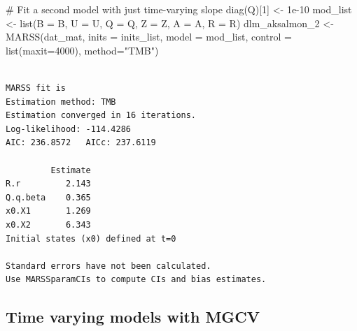 \documentclass[
  letterpaper,
  DIV=11,
  numbers=noendperiod]{scrartcl}
\newenvironment{Shaded}{\begin{snugshade}}{\end{snugshade}}
\newcommand{\AttributeTok}[1]{\textcolor[rgb]{0.40,0.45,0.13}{#1}}
\newcommand{\CommentTok}[1]{\textcolor[rgb]{0.37,0.37,0.37}{#1}}
\newcommand{\DecValTok}[1]{\textcolor[rgb]{0.68,0.00,0.00}{#1}}
\newcommand{\FloatTok}[1]{\textcolor[rgb]{0.68,0.00,0.00}{#1}}
\newcommand{\FunctionTok}[1]{\textcolor[rgb]{0.28,0.35,0.67}{#1}}
\newcommand{\NormalTok}[1]{\textcolor[rgb]{0.00,0.23,0.31}{#1}}
\newcommand{\OtherTok}[1]{\textcolor[rgb]{0.00,0.23,0.31}{#1}}
\newcommand{\StringTok}[1]{\textcolor[rgb]{0.13,0.47,0.30}{#1}}
\begin{document}
\begin{Shaded}
\begin{Highlighting}[]
\CommentTok{\# Fit a second model with just time{-}varying slope}
\FunctionTok{diag}\NormalTok{(Q)[}\DecValTok{1}\NormalTok{] }\OtherTok{\textless{}{-}} \FloatTok{1e{-}10}
\NormalTok{mod\_list }\OtherTok{\textless{}{-}} \FunctionTok{list}\NormalTok{(}\AttributeTok{B =}\NormalTok{ B, }\AttributeTok{U =}\NormalTok{ U, }\AttributeTok{Q =}\NormalTok{ Q, }\AttributeTok{Z =}\NormalTok{ Z, }\AttributeTok{A =}\NormalTok{ A, }\AttributeTok{R =}\NormalTok{ R)}
\NormalTok{dlm\_aksalmon\_2 }\OtherTok{\textless{}{-}} \FunctionTok{MARSS}\NormalTok{(dat\_mat, }\AttributeTok{inits =}\NormalTok{ inits\_list, }\AttributeTok{model =}\NormalTok{ mod\_list,}
               \AttributeTok{control =} \FunctionTok{list}\NormalTok{(}\AttributeTok{maxit=}\DecValTok{4000}\NormalTok{), }\AttributeTok{method=}\StringTok{"TMB"}\NormalTok{)}
\end{Highlighting}
\end{Shaded}

\begin{verbatim}

MARSS fit is
Estimation method: TMB 
Estimation converged in 16 iterations. 
Log-likelihood: -114.4286 
AIC: 236.8572   AICc: 237.6119   
 
         Estimate
R.r         2.143
Q.q.beta    0.365
x0.X1       1.269
x0.X2       6.343
Initial states (x0) defined at t=0

Standard errors have not been calculated. 
Use MARSSparamCIs to compute CIs and bias estimates.
\end{verbatim}

\subsection{Time varying models with
MGCV}\label{time-varying-models-with-mgcv}
\end{document}
